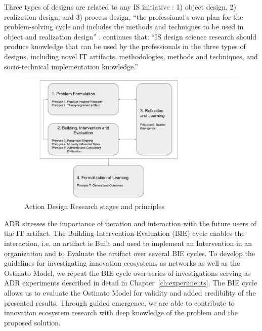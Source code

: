 Three types of designs are related to any IS initiative \citep{Carlsson2010DesignApproach, Aken2004ManagementRules}: 1) object design, 2) realization design, and 3) process design, ``the professional’s own plan for the problem-solving cycle and includes the methods and techniques to be used in object and realization design'' \citep{Carlsson2010DesignApproach}. \cite{Carlsson2010DesignApproach} continues that: ``IS design science research should produce knowledge that can be used by the professionals in the three types of designs, including novel IT artifacts, methodologies, methods and techniques, and socio-technical implementation knowledge.''

\begin{figure}[htb]
\centering
\includegraphics[width=12cm]{diagram/Action_Design_Research_Reproduced.pdf}
\caption{Action Design Research stages and principles \citep[reproduced following][]{Sein2011ActionResearch}}
\label{fig:adr-stages-and-principles}
\end{figure}

ADR stresses the importance of iteration and interaction with the future users of the IT artifact. The Building-Intervention-Evaluation (BIE) cycle enables the interaction, i.e. an artifact is Built and used to implement an Intervention in an organization and to Evaluate the artifact over several BIE cycles. To develop the guidelines for investigating innovation ecosystems as networks as well as the Ostinato Model, we repeat the BIE cycle over series of investigations serving as ADR experiments described in detail in Chapter~\ref{ch:experiments}. The BIE cycle allows us to evaluate the Ostinato Model for validity and added credibility of the presented results. Through guided emergence, we are able to contribute to innovation ecosystem research with deep knowledge of the problem and the proposed solution.

